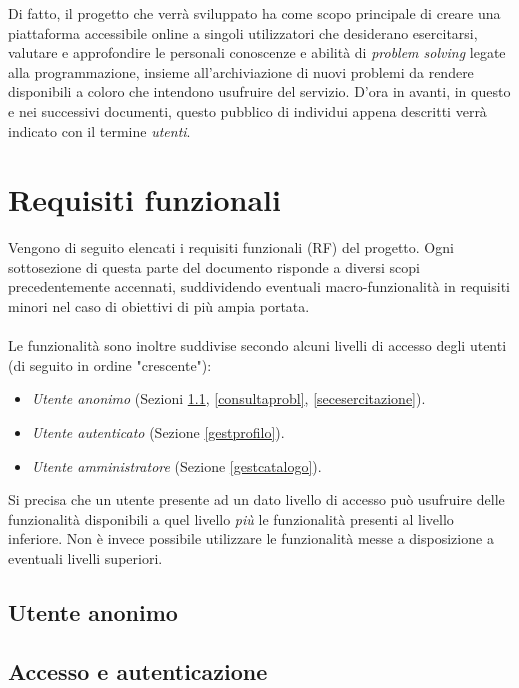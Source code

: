 \documentclass[11pt, a4paper]{article}
\theoremstyle{definition}
\begin{document}
Di fatto, il progetto che verrà sviluppato ha come scopo principale di
creare una piattaforma accessibile online a singoli utilizzatori che
desiderano esercitarsi, valutare e approfondire le personali
conoscenze e abilità di \textit{problem solving} legate alla programmazione,
insieme all'archiviazione di nuovi problemi da rendere disponibili a coloro
che intendono usufruire del servizio.
D'ora in avanti, in questo e nei successivi documenti, questo pubblico di
individui appena descritti verrà indicato con il termine \textit{utenti}.

\newpage
\section{Requisiti funzionali}
Vengono di seguito elencati i requisiti funzionali (RF)
del progetto. Ogni sottosezione di questa parte del documento
risponde a diversi scopi precedentemente accennati, suddividendo
eventuali macro-funzionalità in requisiti minori nel caso di obiettivi
di più ampia portata.
\\\\
\noindent Le funzionalità sono inoltre suddivise secondo alcuni livelli di accesso
degli utenti (di seguito in ordine "crescente"):
\begin{itemize}
    \item \textit{Utente anonimo} (Sezioni \ref{accessauth}, \ref{consultaprobl}, \ref{secesercitazione}).
    \item \textit{Utente autenticato} (Sezione \ref{gestprofilo}).
    \item \textit{Utente amministratore} (Sezione \ref{gestcatalogo}).
\end{itemize}
Si precisa che un utente presente ad un dato livello di accesso può usufruire
delle funzionalità disponibili a quel livello \textit{più} le funzionalità
presenti al livello inferiore. Non è invece possibile utilizzare le funzionalità
messe a disposizione a eventuali livelli superiori.

\begin{center}
\section*{Utente anonimo}    
\end{center}


\subsection{Accesso e autenticazione}\label{accessauth}
\end{document}
